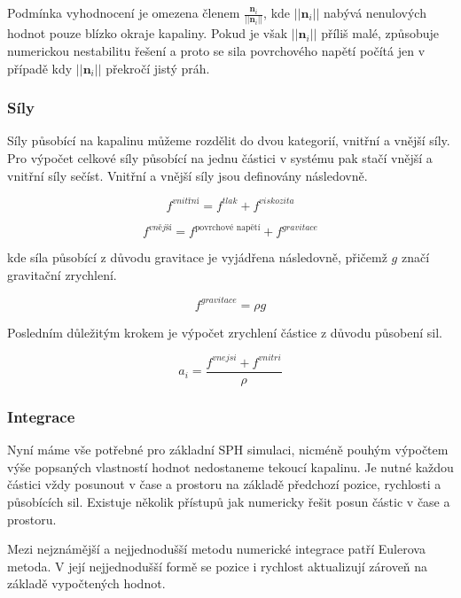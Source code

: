 Podmínka vyhodnocení je omezena členem $\frac{\mathbf{n}_i}{||\mathbf{n}_i||}$, kde $||\mathbf{n}_i||$ nabývá nenulových hodnot pouze blízko okraje kapaliny. Pokud je však $||\mathbf{n}_i||$ příliš malé, způsobuje numerickou nestabilitu řešení a proto se sila povrchového napětí počítá jen v případě kdy $||\mathbf{n}_i||$ překročí jistý práh.


\subsubsection{Síly}
Síly působící na kapalinu můžeme rozdělit do dvou kategorií, vnitřní a vnější síly. Pro výpočet celkové síly působící na jednu částici v systému pak stačí vnější a vnitřní síly sečíst. Vnitřní a vnější síly jsou definovány následovně. \cite{KelagerSPH}

\begin{equation}
    f^{vnitřní} = f^{tlak} + f^{viskozita}
    \label{eq:ForceInt}
\end{equation}

\begin{equation}
    f^{vnější} = f^{\text{povrchové napětí}} + f^{gravitace}
    \label{eq:ForceExt}
\end{equation}

kde síla působící z důvodu gravitace je vyjádřena následovně, přičemž $g$ značí gravitační zrychlení.

\begin{equation}
    f^{gravitace} = \rho g
\end{equation}

Posledním důležitým krokem je výpočet zrychlení částice z důvodu působení sil.

\begin{equation}
    a_i = \frac{f^{vnejsi} + f^{vnitri}}{\rho}
    \label{eq:Acc}
\end{equation}

\subsubsection{Integrace}
Nyní máme vše potřebné pro základní SPH simulaci, nicméně pouhým výpočtem výše popsaných vlastností hodnot nedostaneme tekoucí kapalinu. Je nutné každou částici vždy posunout v čase a prostoru na základě předchozí pozice, rychlosti a působících sil. Existuje několik přístupů jak numericky řešit posun částic v čase a prostoru.

Mezi nejznámější a nejjednodušší metodu numerické integrace patří Eulerova metoda. V její nejjednodušší formě se pozice i rychlost aktualizují zároveň na základě vypočtených hodnot.

